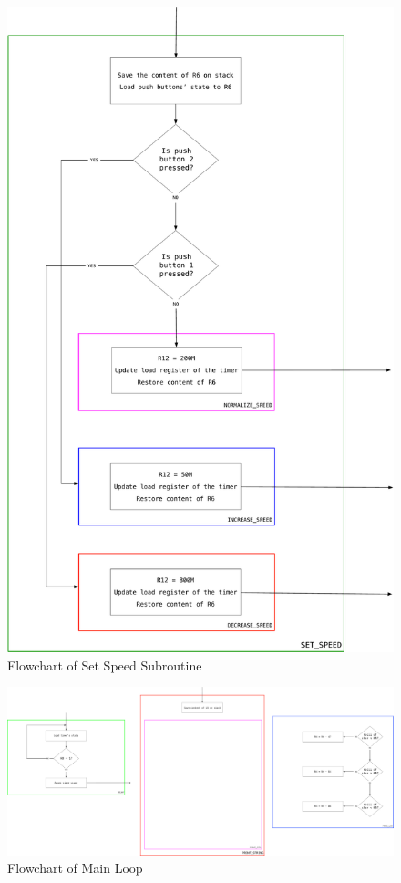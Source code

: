 \documentclass[titlepage]{article}
\begin{document}
	\begin{figure}[h]
		\centering
		\includegraphics[scale=.35]{../images/set_speed.pdf}
		\caption{Flowchart of Set Speed Subroutine}
	\end{figure}
	\begin{figure}[h]
		\centering
		\includegraphics[scale=.15]{../images/print_string.pdf}
		\caption{Flowchart of Main Loop}
	\end{figure}
\end{document}
